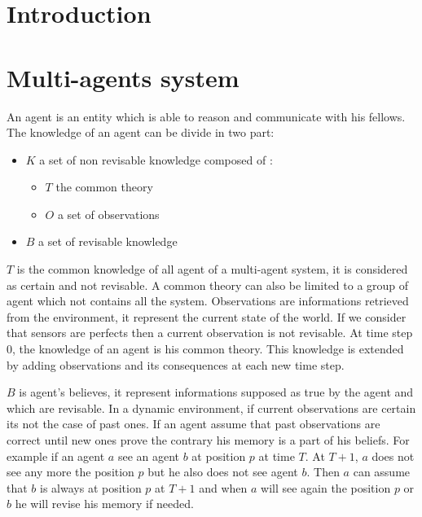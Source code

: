 \documentclass{aamas2012}
\begin{document}



\section{Introduction}

\section{Multi-agents system}

	\begin{definition}[Agent]
		\label{agent_definition}
		An agent is an entity which is able to reason and communicate with his fellows.
		The knowledge of an agent can be divide in two part:\newline
		\begin{itemize}
			\item $K$ a set of non revisable knowledge composed of :
			\begin{itemize}
				\item $T$ the common theory
				\item $O$ a set of observations
			\end{itemize}
			\item $B$ a set of revisable knowledge
		\end{itemize}
	\end{definition}
	
	$T$ is the common knowledge of all agent of a multi-agent system, it is considered as certain and not revisable.
	A common theory can also be limited to a group of agent which not contains all the system.
	Observations are informations retrieved from the environment, it represent the current state of the world.
	If we consider that sensors are perfects then a current observation is not revisable.
	At time step 0, the knowledge of an agent is his common theory.
	This knowledge is extended by adding observations and its consequences at each new time step.

	$B$ is agent's believes, it represent informations supposed as true by the agent and which are revisable.
	In a dynamic environment, if current observations are certain its not the case of past ones.
	If an agent assume that past observations are correct until new ones prove the contrary his memory is a part of his beliefs.
	For example if an agent $a$ see an agent $b$ at position $p$ at time $T$.
	At $T+1$, $a$ does not see any more the position $p$ but he also does not see agent $b$.
	Then $a$ can assume that $b$ is always at position $p$ at $T+1$ and when $a$ will see again the position $p$ or $b$ he will revise his memory if needed.
	
\end{document}
